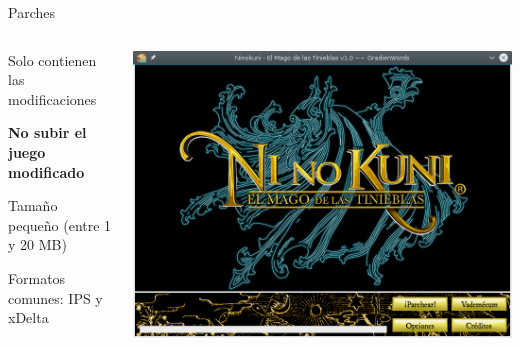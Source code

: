 \begin{frame}{Parches}
    \begin{columns}
    \begin{column}{0.6\textwidth}
        \small
        \begin{wideitemize}
            \item<1-> Solo contienen las modificaciones
            \item<1-> \textbf{No subir el juego modificado}
            \item<2-> Tamaño pequeño (entre 1 y 20 MB)
            \item<3-> Formatos comunes: IPS y xDelta
        \end{wideitemize}
    \end{column}
    \begin{column}{0.4\textwidth}
        \includegraphics[width=\textwidth]{imgs/ninopatcher.png}
    \end{column}
    \end{columns}
\end{frame}

